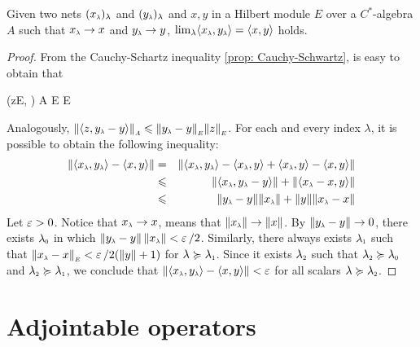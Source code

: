 \begin{lema}
\label{lema: lim <x_lambda,y_lambda> = <x,y>}
Given two nets $(\sub x\lambda)_\lambda$ and $(\sub y\lambda)_\lambda$ and $x,y$ in a Hilbert module $E$ over a $C^*$-algebra $A$ such that $\sub x\lambda \to x$ and $\sub y\lambda \to y$,  $\lim_\lambda \inner{\sub x\lambda}{\sub y\lambda} = \inner xy$ holds.
\begin{proof}
From the Cauchy-Schartz inequality \ref{prop: Cauchy-Schwartz}, is easy to obtain that
\begin{eqspaced*}{(z\in E, \lambda \in \LLambda)}
    A \overset{(\ref{eq: cauchy-schwarts})}\leqslant {}E E
\end{eqspaced*}
Analogously, $\sub{\|\inner z{\sub y\lambda-y}\|}A \leqslant \sub{\|\sub y\lambda-y\|}E \sub{\|z\|}E$. For each and every index $\lambda$, it is possible to obtain the following inequality:
\begin{eqnarray*}
    \|\inner{\sub x\lambda}{\sub y\lambda} - \inner xy\| &=& \|\inner{\sub x\lambda}{\sub y\lambda} - \inner{\sub x\lambda}y + \inner{\sub x\lambda}y- \inner xy\|  \\
    &\leqslant& \|\inner{\sub x\lambda}{\sub y\lambda-y}\| + \| \inner{\sub x\lambda-x}y\| \\
    &\leqslant& \|\sub y\lambda-y\| \|\sub x\lambda\| +\|y\|\|\sub x\lambda-x\| 
\end{eqnarray*}
Let $\operatorname{{\varepsilon}} > 0$. Notice that $\sub x\lambda \to x$, means that $\|\sub x\lambda\| \to \|x\|$. By $\|\sub y\lambda -y\|\to 0$,  there exists $\sub\lambda 0$ in which $\|\sub y\lambda - y\|\,\|\sub x\lambda\|  < \ep/2 $. Similarly, there always exists $\sub\lambda1$ such that $\sub{\|\sub x\lambda -x\|}E < \ep/2({\|y\|}+1)$ for $\lambda \succeq \sub\lambda1$. Since it exists $\sub\lambda2 $ such that $\sub\lambda2 \succeq \sub\lambda0$ and $\sub\lambda2 \succeq \sub\lambda1$, we conclude that $\|\inner{\sub x\lambda}{\sub y\lambda} - \inner xy\| < \ep$ for all scalars $\lambda \succeq \sub\lambda2$.
\end{proof}
\end{lema}



\section{Adjointable operators}

